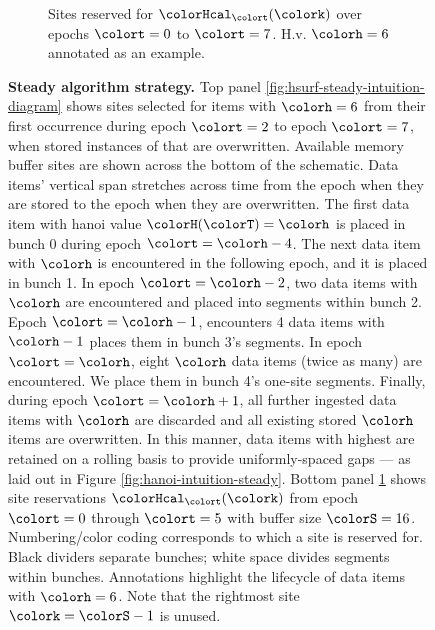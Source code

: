 \begin{figure}[htbp!]
\begin{subfigure}[b]{0.98\linewidth}
\begin{tikzpicture}
    \end{tikzpicture}
    \vspace{-5ex}
    \caption{\footnotesize Sites reserved for \hv{} $\colorHcal_{\colort}(\colork)$ over epochs $\colort=0$ to $\colort=7$. H.v.{} $\colorh=6$ annotated as an example.}
    \label{fig:hsurf-steady-intuition-heatmap}
  \end{subfigure}%
  \vspace{-2ex}
  \caption{
    \textbf{Steady algorithm strategy.}
    \footnotesize
    Top panel \ref{fig:hsurf-steady-intuition-diagram} shows sites selected for items with \hv{} $\colorh=6$ from their first occurrence during epoch $\colort=2$ to epoch $\colort=7$, when stored instances of that \hv{} are overwritten.
    Available memory buffer sites are shown across the bottom of the schematic.
    Data items' vertical span stretches across time from the epoch when they are stored to the epoch when they are overwritten.
    The first data item with hanoi value $\colorH(\colorT) = \colorh$ is placed in bunch 0 during epoch $\colort=\colorh-4$.
    The next data item with \hv{} $\colorh$ is encountered in the following epoch, and it is placed in bunch 1.
    In epoch $\colort=\colorh-2$, two data items with \hv{} $\colorh$ are encountered and placed into segments within bunch 2.
    Epoch $\colort=\colorh-1$, encounters 4 data items with \hv{} $\colorh-1$ places them in bunch 3's segments.
    In epoch $\colort=\colorh$, eight \hv{} $\colorh$ data items (twice as many) are encountered.
    We place them in bunch 4's one-site segments.
    Finally, during epoch $\colort=\colorh+1$, all further ingested data items with \hv{} $\colorh$ are discarded and all existing stored \hv{} $\colorh$ items are overwritten.
    In this manner, data items with highest \hv{} are retained on a rolling basis to provide uniformly-spaced gaps --- as laid out in Figure \ref{fig:hanoi-intuition-steady}.
    Bottom panel \ref{fig:hsurf-steady-intuition-heatmap} shows \hv{} site reservations $\colorHcal_{\colort}(\colork)$ from epoch $\colort=0$ through $\colort=5$ with buffer size $\colorS=16$.
    Numbering/color coding corresponds to which \hv{} a site is reserved for.
    Black dividers separate bunches; white space divides segments within bunches.
    Annotations highlight the lifecycle of data items with \hv{} $\colorh=6$.
    Note that the rightmost site $\colork=\colorS-1$ is unused.
  }
  \label{fig:hsurf-steady-intuition}
\end{figure}

